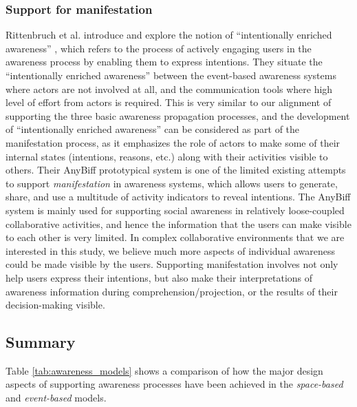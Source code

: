 \subsubsection{Support for manifestation} %
\label{ssub:support_for_manifestation}
Rittenbruch et al. introduce and explore the notion of ``intentionally enriched awareness'' \cite{Rittenbruch2007}, which refers to the process of actively engaging users in the awareness process by enabling them to express intentions. They situate the ``intentionally enriched awareness'' between the event-based awareness systems where actors are not involved at all, and the communication tools where high level of effort from actors is required. This is very similar to our alignment of supporting the three basic awareness propagation processes, and the development of ``intentionally enriched awareness'' can be considered as part of the manifestation process, as it emphasizes the role of actors to make some of their internal states (intentions, reasons, etc.) along with their activities visible to others. Their AnyBiff prototypical system is one of the limited existing attempts to support \emph{manifestation} in awareness systems, which allows users to generate, share, and use a multitude of activity indicators to reveal intentions. The AnyBiff system is mainly used for supporting social awareness in relatively loose-coupled collaborative activities, and hence the information that the users can make visible to each other is very limited. In complex collaborative environments that we are interested in this study, we believe much more aspects of individual awareness could be made visible by the users. Supporting manifestation involves not only help users express their intentions, but also make their interpretations of awareness information during comprehension/projection, or the results of their decision-making visible.

\subsection{Summary} %
\label{sub:summary}
Table \ref{tab:awareness_models} shows a comparison of how the major design aspects of supporting awareness processes have been achieved in the \emph{space-based} and \emph{event-based} models.

